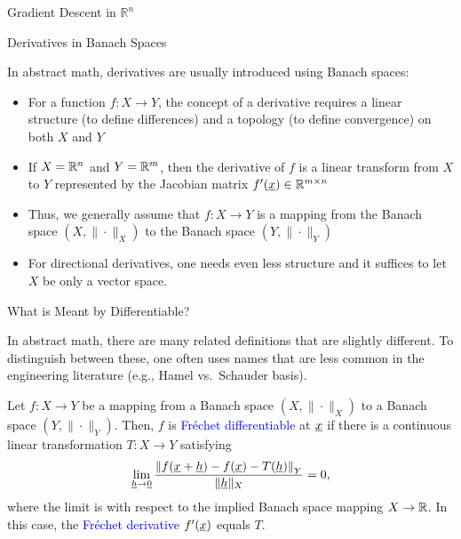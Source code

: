 \documentclass[10pt,english,aspectratio=169]{beamer}
\begin{document}
\begin{frame}{Gradient Descent in $\mathbb{R}^n$}
\begin{itemize}
\end{itemize}

\end{frame}

\begin{frame}{Derivatives in Banach Spaces}

In abstract math, derivatives are usually introduced using Banach spaces: \vspace{1mm}
\begin{itemize}
\setlength\itemsep{3mm}
\item<1-> For a function $f \colon X \rightarrow Y$, the concept of a derivative requires a linear structure (to define differences) and a topology (to define convergence) on both $X$ and $Y$ \vspace{1mm}

\item<2-> If $X=\mathbb{R}^n$ and $Y=\mathbb{R}^m$, then the derivative of $f$ is a linear transform from $X$ to $Y$ represented by the Jacobian matrix $f'(\underline{x}) \in \mathbb{R}^{m\times n}$ \vspace{1mm}

\item<3-> Thus, we generally assume that $f \colon X \rightarrow Y$ is a mapping from the Banach space $(X,\|\cdot\|_X)$ to the Banach space $(Y,\|\cdot\|_Y)$ \vspace{1mm}

\item<4-> For directional derivatives, one needs even less structure and it suffices to let $X$ be only a vector space.

\end{itemize}
\end{frame}

\begin{frame}{What is Meant by Differentiable?}

In abstract math, there are many related definitions that are slightly different.
To distinguish between these, one often uses names that are less common in the engineering literature (e.g., Hamel vs.\ Schauder basis).

\vspace{3mm}

\begin{definition}[Differentiable]
Let $f \colon X \rightarrow Y$ be a mapping from a Banach space $(X,\|\cdot\|_X)$ to a Banach space $(Y,\|\cdot\|_Y)$.
Then, $f$ is \textcolor{blue}{Fr\'{e}chet differentiable} at $\underline{x}$ if there is a continuous linear transformation $T\colon X \to Y$ satisfying
\begin{equation*} \lim_{\underline{h} \to \underline{0}} \frac{\left\|f(\underline{x}+ \underline{h}) - f(\underline{x}) - T(\underline{h}) \right\|_Y}{\| \underline{h} \|_X} = 0,
\end{equation*}
where the limit is with respect to the implied Banach space mapping $X\to \mathbb{R}$.
In this case, the \textcolor{blue}{Fr\'{e}chet derivative} $f'(\underline{x})$ equals $T$.
\end{definition}
\end{frame}
\end{document}
